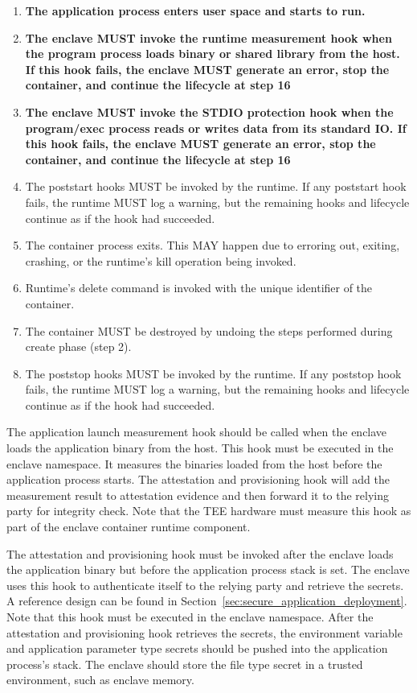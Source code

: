 \begin{enumerate}
    \item \textbf{The application process enters user space and starts to run.}
    \item \textbf{The enclave MUST invoke the runtime measurement hook when the program process loads binary or shared library from the host. If this hook fails, the enclave MUST generate an error, stop the container, and continue the lifecycle at step 16}
    \item \textbf{The enclave MUST invoke the STDIO protection hook when the program/exec process reads or writes data from its standard IO. If this hook fails, the enclave MUST generate an error, stop the container, and continue the lifecycle at step 16}
    \item The poststart hooks MUST be invoked by the runtime. If any poststart hook fails, the runtime MUST log a warning, but the remaining hooks and lifecycle continue as if the hook had succeeded.
    \item The container process exits. This MAY happen due to erroring out, exiting, crashing, or the runtime's kill operation being invoked.
    \item Runtime's delete command is invoked with the unique identifier of the container.
    \item The container MUST be destroyed by undoing the steps performed during create phase (step 2).
    \item The poststop hooks MUST be invoked by the runtime. If any poststop hook fails, the runtime MUST log a warning, but the remaining hooks and lifecycle continue as if the hook had succeeded.    
  \end{enumerate}

  The application launch measurement hook should be called when the enclave loads the application binary from the host. This hook must be executed in the enclave namespace. It measures the binaries loaded from the host before the application process starts. The attestation and provisioning hook will add the measurement result to attestation evidence and then 
  forward it to the relying party for integrity check. Note that the TEE hardware must measure this hook as part of the enclave container runtime component.
 
  The attestation and provisioning hook must be invoked after the enclave loads the application binary but before the application process stack is set. The enclave uses this hook to authenticate itself to the relying party and retrieve the secrets. A reference design can be found in Section~\ref{sec:secure_application_deployment}. Note that this hook must be 
  executed in the enclave namespace. After the attestation and provisioning hook retrieves the secrets, the environment variable and application parameter type secrets should be pushed into the application process's stack. The enclave should store the file type secret in a trusted environment, such as enclave memory. 
   
